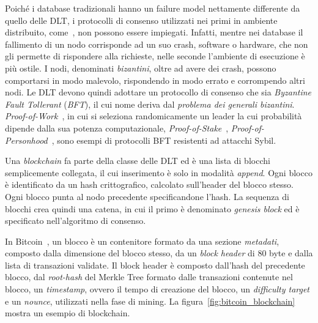 Poiché i database tradizionali hanno un failure model nettamente differente da quello delle DLT, i protocolli di consenso utilizzati nei primi in ambiente distribuito, come~\cite{bernstein1987concurrency, raz1995dynamic}, non possono essere impiegati. Infatti, mentre nei database il fallimento di un nodo corrisponde ad un suo crash, software o hardware, che non gli permette di rispondere alla richieste, nelle seconde l'ambiente di esecuzione è più ostile. I nodi, denominati \emph{bizantini}, oltre ad avere dei crash, possono comportarsi in modo malevolo, rispondendo in modo errato e corrompendo altri nodi.
Le DLT devono quindi adottare un protocollo di consenso che sia \emph{Byzantine Fault Tollerant} (\emph{BFT}), il cui nome deriva dal \textit{problema dei generali bizantini}.
\textit{Proof-of-Work}~\cite{nakamoto2019bitcoin}, in cui si seleziona randomicamente un leader la cui probabilità dipende dalla sua potenza computazionale, \textit{Proof-of-Stake}~\cite{kiayias2017ouroboros}, \textit{Proof-of-Personhood}~\cite{borge2017proof}, sono esempi di protocolli BFT resistenti ad attacchi Sybil.

Una \emph{blockchain} fa parte della classe delle DLT ed è una lista di blocchi semplicemente collegata, il cui inserimento è solo in modalità \emph{append}. Ogni blocco è identificato da un hash crittografico, calcolato sull'header del blocco stesso. Ogni blocco punta al nodo precedente specificandone l'hash. La sequenza di blocchi crea quindi una catena, in cui il primo è denominato \emph{genesis block} ed è specificato nell'algoritmo di consenso.

In Bitcoin~\cite{nakamoto2019bitcoin}, un blocco è un contenitore formato da una sezione \textit{metadati}, composto dalla dimensione del blocco stesso, da un \textit{block header} di 80 byte e dalla lista di transazioni validate. Il block header è composto dall'hash del precedente blocco, dal \emph{root-hash} del Merkle Tree formato dalle transazioni contenute nel blocco, un \emph{timestamp}, ovvero il tempo di creazione del blocco, un \emph{difficulty target} e un \emph{nounce}, utilizzati nella fase di mining.
La figura~\ref{fig:bitcoin_blockchain} mostra un esempio di blockchain.

